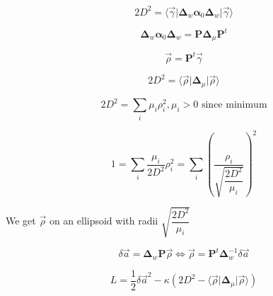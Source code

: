 \documentclass[aps,12pt]{revtex4}
\begin{document}
\begin{equation}
	2 D^2 = \langle \vec{\gamma} \vert \bm{\Delta}_w \bm{\alpha}_0 \bm{\Delta}_w \vert \vec{\gamma} \rangle
\end{equation}

\begin{equation}
	\bm{\Delta}_w \bm{\alpha}_0 \bm{\Delta}_w = \bm{P} \bm{\Delta}_\mu \bm{P}^t
\end{equation}

\begin{equation}
	\vec{\rho} = \bm{P}^t \vec{\gamma}
\end{equation}

\begin{equation}
	2D^2 = \langle \vec{\rho} \vert \bm{\Delta}_\mu \vert \vec{\rho} \rangle
\end{equation}

\begin{equation}
	2D^2 = \sum_i \mu_i \rho_i^2, \text{$\mu_i>0$ since minimum}
\end{equation}

\begin{equation}
	1 = \sum_i  \dfrac{\mu_i}{2D^2} \rho_i^2 = \sum_i \left(\dfrac{\rho_i}{ \sqrt{\dfrac{2D^2}{\mu_i}} }\right)^2
\end{equation}

We get $\vec{\rho}$ on an ellipsoid with radii $\sqrt{\dfrac{2D^2}{\mu_i}}$

\begin{equation}
	\delta\vec{a} = \bm{\Delta}_w\bm{P} \vec{\rho} \iff \vec{\rho} = \bm{P}^t \bm{\Delta}_w^{-1} \delta\vec{a}
\end{equation}

\begin{equation}
	L = \dfrac{1}{2} \delta\vec{a}^2 - \kappa (2D^2 - \langle \vec{\rho} \vert \bm{\Delta}_\mu \vert \vec{\rho} \rangle)
\end{equation}
\end{document}
